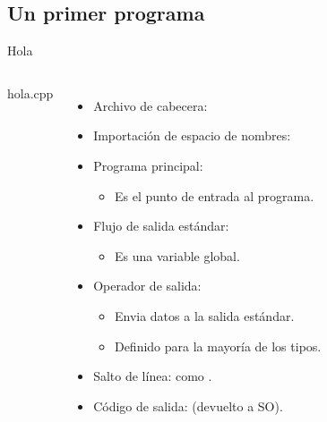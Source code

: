 \subsection{Un primer programa}

\begin{frame}{Hola}
\begin{columns}[T]

\begin{block}{hola.cpp}

\end{block}

  \begin{itemize}
    \item Archivo de cabecera: 
    \item Importación de espacio de nombres: 
    \item Programa principal: 
      \begin{itemize}
        \item Es el punto de entrada al programa.
      \end{itemize}
    \item Flujo de salida estándar: 
        \begin{itemize}
          \item Es una variable global.
        \end{itemize}
    \item Operador de salida: 
        \begin{itemize}
          \item Envia datos a la salida estándar.
          \item Definido para la mayoría de los tipos.
        \end{itemize}
    \item Salto de línea:  como .
    \item Código de salida:  (devuelto a SO).
  \end{itemize}

\end{columns}
\end{frame}
